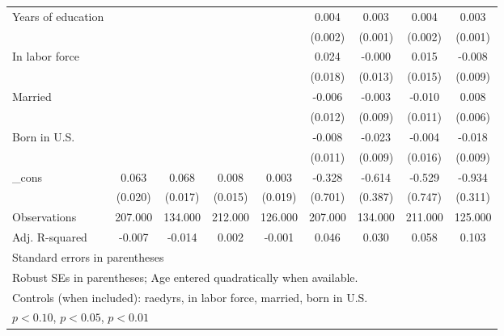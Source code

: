 \begin{table}[htbp]
\begin{tabular}{l*{8}{c}}
Years of education&                  &                  &                  &                  &    0.004\sym{*}  &    0.003\sym{*}  &    0.004\sym{**} &    0.003\sym{**} \\
          &                  &                  &                  &                  &  (0.002)         &  (0.001)         &  (0.002)         &  (0.001)         \\
In labor force&                  &                  &                  &                  &    0.024         &   -0.000         &    0.015         &   -0.008         \\
          &                  &                  &                  &                  &  (0.018)         &  (0.013)         &  (0.015)         &  (0.009)         \\
Married   &                  &                  &                  &                  &   -0.006         &   -0.003         &   -0.010         &    0.008         \\
          &                  &                  &                  &                  &  (0.012)         &  (0.009)         &  (0.011)         &  (0.006)         \\
Born in U.S.&                  &                  &                  &                  &   -0.008         &   -0.023\sym{***}&   -0.004         &   -0.018\sym{*}  \\
          &                  &                  &                  &                  &  (0.011)         &  (0.009)         &  (0.016)         &  (0.009)         \\
\_cons    &    0.063\sym{***}&    0.068\sym{***}&    0.008         &    0.003         &   -0.328         &   -0.614         &   -0.529         &   -0.934\sym{***}\\
          &  (0.020)         &  (0.017)         &  (0.015)         &  (0.019)         &  (0.701)         &  (0.387)         &  (0.747)         &  (0.311)         \\
\midrule
Observations&  207.000         &  134.000         &  212.000         &  126.000         &  207.000         &  134.000         &  211.000         &  125.000         \\
Adj. R-squared&   -0.007         &   -0.014         &    0.002         &   -0.001         &    0.046         &    0.030         &    0.058         &    0.103         \\
\bottomrule
\multicolumn{9}{l}{\footnotesize Standard errors in parentheses}\\
\multicolumn{9}{l}{\footnotesize Robust SEs in parentheses; Age entered quadratically when available.}\\
\multicolumn{9}{l}{\footnotesize Controls (when included): raedyrs, in labor force, married, born in U.S.}\\
\multicolumn{9}{l}{\footnotesize \sym{*} \(p<0.10\), \sym{**} \(p<0.05\), \sym{***} \(p<0.01\)}\\
\end{tabular}
\end{table}
